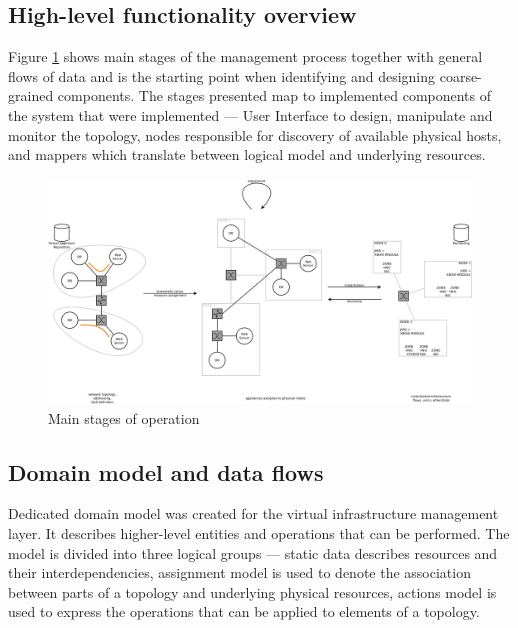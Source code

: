 \documentclass[11pt]{book}
\begin{document}
      \subsection{High-level functionality overview}
      \label{sub:arch:hl}

        Figure \ref{fig:arch:hl} shows main stages of the management process together with general flows of data and is
        the starting point when identifying and designing coarse-grained components. The stages presented map to
        implemented components of the system that were implemented --- User Interface to design, manipulate and monitor
        the topology, nodes responsible for discovery of available physical hosts, and mappers which translate between
        logical model and underlying resources.


        \begin{figure}[H]
          \begin{center}
            \includegraphics[width=\textwidth]{img/architecture/scope.pdf}
          \end{center}

          \caption{Main stages of operation}
          \label{fig:arch:hl}
        \end{figure}


      \subsection{Domain model and data flows}
      \label{sec:domain-model}

        Dedicated domain model was created for the virtual infrastructure management layer. It describes higher-level
        entities and operations that can be performed. The model is divided into three logical groups --- static data
        describes resources and their interdependencies, assignment model is used to denote the association between
        parts of a topology and underlying physical resources, actions model is used to express the operations that can
        be applied to elements of a topology.
\end{document}
